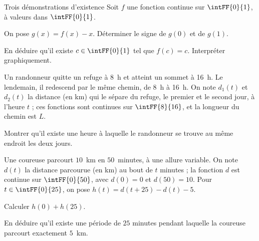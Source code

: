\begin{exercice}[3]{Trois démonstrations d'existence}
Soit $f$ une fonction continue sur $\intFF{0}{1}$, à valeurs dans $\intFF{0}{1}$.
\begin{questions}
  \item On pose $g(x)=f(x)-x$. Déterminer le signe de $g(0)$ et de $g(1)$.
  \item En déduire qu'il existe $c\in\intFF{0}{1}$ tel que $f(c)=c$. Interpréter graphiquement.
\end{questions}
Un randonneur quitte un refuge à 8~h et atteint un sommet à 16~h. Le lendemain, il redescend par le même chemin, de 8~h à
16~h. On note $d_1(t)$ et $d_2(t)$ la distance (en km) qui le sépare du refuge, le premier et le second jour, à l'heure $t$ ;
ces fonctions sont continues sur $\intFF{8}{16}$, et la longueur du chemin est $L$.
\begin{questions}[resume]
  \item Montrer qu'il existe une heure à laquelle le randonneur se trouve au même endroit les deux jours.
\end{questions}
Une coureuse parcourt $10$~km en $50$~minutes, à une allure variable. On note $d(t)$ la distance parcourue (en km) au bout de
$t$ minutes ; la fonction $d$ est continue sur $\intFF{0}{50}$, avec $d(0)=0$ et $d(50)=10$. Pour $t\in\intFF{0}{25}$, on pose
$h(t)=d(t+25)-d(t)-5$.
\begin{questions}[resume]
  \item Calculer $h(0)+h(25)$.
  \item En déduire qu'il existe une période de $25$ minutes pendant laquelle la coureuse parcourt exactement $5$~km.
\end{questions}
\end{exercice}
